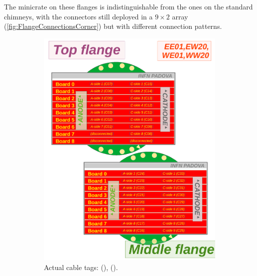 The minicrate on these flanges is indistinguishable from the ones on the standard chimneys,
with the connectors still deployed in a $9 \times 2$ array
(\cref{fig:FlangeConnectionsCorner})
but with different connection patterns.

\begin{figure}
  \begin{subfigure}{0.50\linewidth}
    \includegraphics[width=\textwidth]{figures/CornerFlangesAndMinicrate_upward}
    \caption{Actual cable tags:  (),  ().}
    \label{fig:FlangeConnectionsCorner_upward}
  \end{subfigure}
  \begin{subfigure}{0.50\linewidth}

\end{subfigure}
\end{figure}
